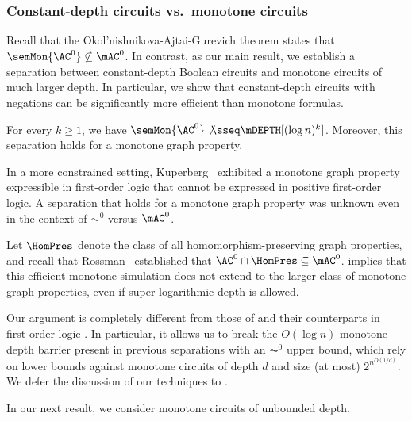 \documentclass[11pt]{article}
\begin{document}
\subsubsection{Constant-depth circuits vs.~monotone circuits}

Recall that the  Okol'nishnikova-Ajtai-Gurevich \cite{okolnishnikova_1982,ajtai_gurevich_1987} theorem states that 
$\semMon{\AC^0} \nsubseteq \mAC^0$. In contrast, as our
main result, we establish a separation between constant-depth Boolean
circuits
and monotone circuits of much larger depth. In particular, we show that constant-depth circuits with negations can be significantly more efficient than  monotone formulas.


\begin{theorem}
    \label{thm:ac0-fml-graph-intro}
    For every $k \geq 1$,
    we have
    $\semMon{\AC^0} \not\sseq \mDEPTH[(\log n)^k]$. Moreover, this separation holds for a monotone graph property.
\end{theorem}

In a more constrained setting, Kuperberg~\cite{DBLP:conf/lics/Kuperberg21, DBLP:journals/corr/abs-2201-11619} 
exhibited a monotone graph property expressible in first-order logic 
that cannot be expressed in positive first-order logic. A separation that holds for a monotone graph property was unknown even in the context of $\AC^0$ versus $\mAC^0$.


Let $\HomPres$ denote the class of all homomorphism-preserving graph properties, and recall that Rossman~\cite{rossman_2008, rossman_16} established that 
$\AC^0 \cap \HomPres \subseteq \mAC^0$.  implies that this efficient monotone simulation does not extend to the larger class of monotone graph properties, even if super-logarithmic depth is allowed. 



Our argument is completely different from those of \citep{okolnishnikova_1982, ajtai_gurevich_1987, BST13, cos15} and their counterparts in first-order logic \citep{DBLP:conf/lics/Stolboushkin95, DBLP:conf/lics/Kuperberg21, DBLP:journals/corr/abs-2201-11619}. In particular, it allows us to break the $O(\log n)$ monotone depth barrier present in previous separations with an 
$\AC^0$ upper bound, which rely on lower bounds against monotone circuits of depth $d$ and size (at most) $2^{n^{O(1/d)}}$. We defer the discussion of our techniques to .

In our next result, we consider monotone circuits of unbounded depth.
\end{document}
